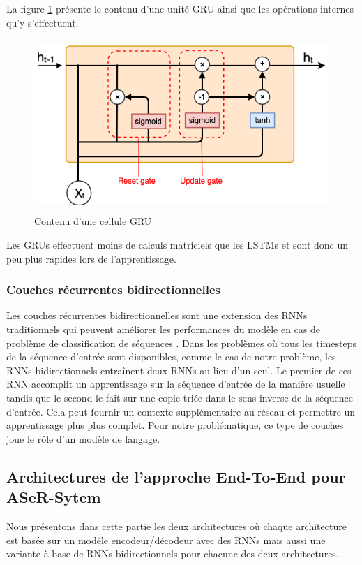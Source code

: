 La figure \ref{GRUU} présente le contenu d'une unité GRU ainsi que les opérations internes qu'y s'effectuent.

\begin{figure}[H]
    \centering
    \includegraphics[height=185pt,width=325pt]{images/chap3/GRU.png}
    \caption{Contenu d'une cellule GRU}
    \label{GRUU}
\end{figure}

Les GRUs effectuent moins de calculs matriciels que les LSTMs et sont donc un peu plus rapides lors de l'apprentissage.

\subsubsection{Couches récurrentes bidirectionnelles}
Les couches récurrentes bidirectionnelles sont une extension des RNNs traditionnels qui peuvent améliorer les performances du modèle en cas de problème de classification de séquences \cite{bilstmdef}. Dans les problèmes où tous les timesteps de la séquence d'entrée sont disponibles, comme le cas de notre problème, les RNNs bidirectionnels entraînent deux RNNs au lieu d'un seul. Le premier de ces RNN accomplit un apprentissage sur la séquence d'entrée de la manière usuelle tandis que le second le fait sur une copie triée dans le sens inverse de la séquence d'entrée. Cela peut fournir un contexte supplémentaire au réseau et permettre un apprentissage plus plus complet. Pour notre problématique, ce type de couches joue le rôle d'un modèle de langage. 

\subsection{Architectures de l'approche End-To-End pour ASeR-Sytem}
Nous présentons dans cette partie les deux architectures où chaque architecture est basée sur un modèle encodeur/décodeur avec des RNNs mais aussi une variante à base de RNNs bidirectionnels pour chacune des deux architectures.

